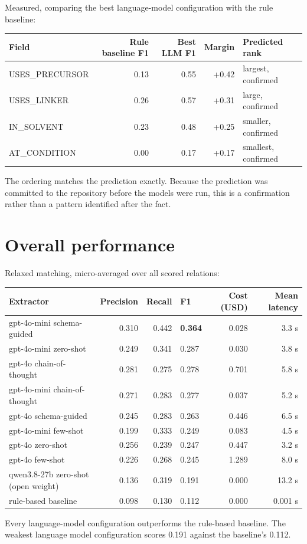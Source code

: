 \documentclass[11pt,a4paper,oneside]{report}
\begin{document}
Measured, comparing the best language-model configuration with the rule baseline:

\par\medskip
\begingroup
\small\setlength{\tabcolsep}{6pt}
\begin{tabular}{@{}lrrrl@{}}
\toprule
\textbf{Field} & \textbf{Rule baseline F1} & \textbf{Best LLM F1} & \textbf{Margin} & \textbf{Predicted rank} \\
\midrule
USES\_PRECURSOR & 0.13 & 0.55 & +0.42 & largest, confirmed \\
USES\_LINKER & 0.26 & 0.57 & +0.31 & large, confirmed \\
IN\_SOLVENT & 0.23 & 0.48 & +0.25 & smaller, confirmed \\
AT\_CONDITION & 0.00 & 0.17 & +0.17 & smallest, confirmed \\
\bottomrule
\end{tabular}
\endgroup
\par\medskip
The ordering matches the prediction exactly. Because the prediction was committed to the repository before the models were run, this is a confirmation rather than a pattern identified after the fact.

\section{Overall performance}

Relaxed matching, micro-averaged over all scored relations:

\par\medskip
\begingroup
\small\setlength{\tabcolsep}{6pt}
\begin{tabularx}{\linewidth}{@{}Lrrlrr@{}}
\toprule
\textbf{Extractor} & \textbf{Precision} & \textbf{Recall} & \textbf{F1} & \textbf{Cost (USD)} & \textbf{Mean latency} \\
\midrule
gpt-4o-mini schema-guided & 0.310 & 0.442 & \textbf{0.364} & 0.028 & 3.3 s \\
gpt-4o-mini zero-shot & 0.249 & 0.341 & 0.287 & 0.030 & 3.8 s \\
gpt-4o chain-of-thought & 0.281 & 0.275 & 0.278 & 0.701 & 5.8 s \\
gpt-4o-mini chain-of-thought & 0.271 & 0.283 & 0.277 & 0.037 & 5.2 s \\
gpt-4o schema-guided & 0.245 & 0.283 & 0.263 & 0.446 & 6.5 s \\
gpt-4o-mini few-shot & 0.199 & 0.333 & 0.249 & 0.083 & 4.5 s \\
gpt-4o zero-shot & 0.256 & 0.239 & 0.247 & 0.447 & 3.2 s \\
gpt-4o few-shot & 0.226 & 0.268 & 0.245 & 1.289 & 8.0 s \\
qwen3.8-27b zero-shot (open weight) & 0.136 & 0.319 & 0.191 & 0.000 & 13.2 s \\
rule-based baseline & 0.098 & 0.130 & 0.112 & 0.000 & 0.001 s \\
\bottomrule
\end{tabularx}
\endgroup
\par\medskip
Every language-model configuration outperforms the rule-based baseline. The weakest language model configuration scores 0.191 against the baseline's 0.112.
\end{document}
